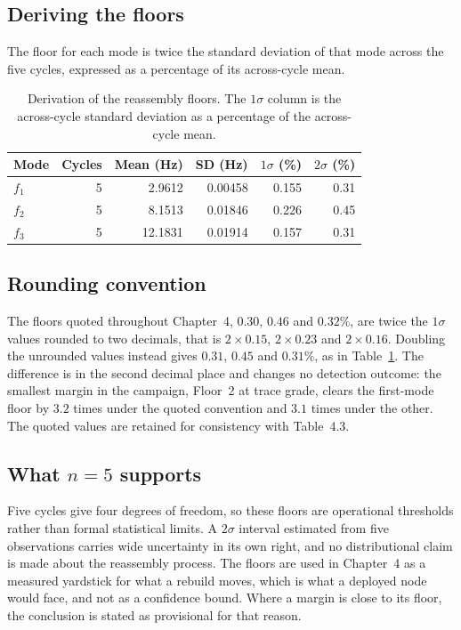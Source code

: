 \subsection*{Deriving the floors}

The floor for each mode is twice the standard deviation of that mode across the
five cycles, expressed as a percentage of its across-cycle mean.

\begin{table}[htbp]
\centering
\caption{Derivation of the reassembly floors. The $1\sigma$ column is the
across-cycle standard deviation as a percentage of the across-cycle mean.}
\label{tab:reassembly-floors}
\begin{tabular}{lrrrrr}
\toprule
Mode & Cycles & Mean (Hz) & SD (Hz) & $1\sigma$ (\%) & $2\sigma$ (\%) \\
\midrule
$f_1$ & 5 & 2.9612 & 0.00458 & 0.155 & 0.31 \\
$f_2$ & 5 & 8.1513 & 0.01846 & 0.226 & 0.45 \\
$f_3$ & 5 & 12.1831 & 0.01914 & 0.157 & 0.31 \\
\bottomrule
\end{tabular}
\end{table}

\subsection*{Rounding convention}

The floors quoted throughout Chapter~4, $0.30$, $0.46$ and $0.32\%$, are twice
the $1\sigma$ values rounded to two decimals, that is $2 \times 0.15$,
$2 \times 0.23$ and $2 \times 0.16$. Doubling the unrounded values instead gives
$0.31$, $0.45$ and $0.31\%$, as in Table~\ref{tab:reassembly-floors}. The
difference is in the second decimal place and changes no detection outcome: the
smallest margin in the campaign, Floor~2 at trace grade, clears the first-mode
floor by $3.2$ times under the quoted convention and $3.1$ times under the other.
The quoted values are retained for consistency with Table~4.3.

\subsection*{What $n = 5$ supports}

Five cycles give four degrees of freedom, so these floors are operational
thresholds rather than formal statistical limits. A $2\sigma$ interval estimated
from five observations carries wide uncertainty in its own right, and no
distributional claim is made about the reassembly process. The floors are used in
Chapter~4 as a measured yardstick for what a rebuild moves, which is what a
deployed node would face, and not as a confidence bound. Where a margin is close
to its floor, the conclusion is stated as provisional for that reason.
